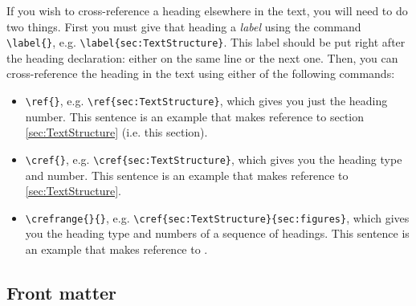 \documentclass[11pt,twoside,openright]{report}
\begin{document}
If you wish to cross-reference a heading elsewhere in the text, you will need to do two things. 
First you must give that heading a \emph{label} using the command \verb|\label{}|, e.g. \verb|\label{sec:TextStructure}|. This label should be put right after the heading declaration: either on the same line or the next one.
Then, you can cross-reference the heading in the text using either of the following commands:
\begin{itemize}
    \item \verb|\ref{}|, e.g. \verb|\ref{sec:TextStructure}|, which gives you just the heading number. This sentence is an example that makes reference to section \ref{sec:TextStructure} (i.e. this section).
    \item \verb|\cref{}|, e.g. \verb|\cref{sec:TextStructure}|, which gives you the heading type and number. This sentence is an example that makes reference to \cref{sec:TextStructure}.
    \item \verb|\crefrange{}{}|, e.g. \verb|\cref{sec:TextStructure}{sec:figures}|, which gives you the heading type and numbers of a sequence of headings. This sentence is an example that makes reference to .
\end{itemize}


\subsection{Front matter}
\label{subsec:frontmatter}
\end{document}

